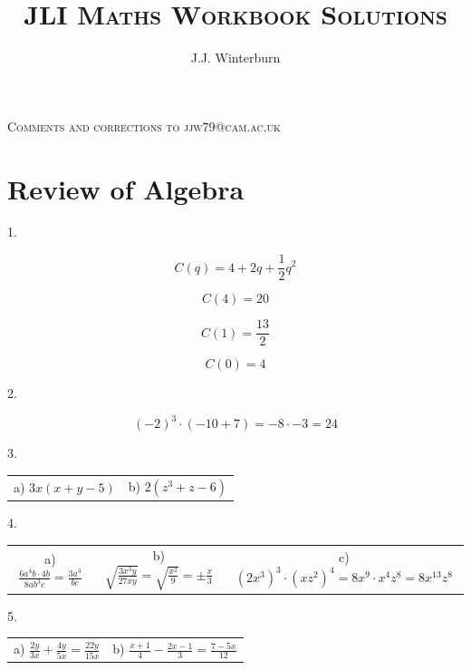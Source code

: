 \documentclass{article}
\begin{document}
\title{\Huge\textsc{JLI Maths Workbook Solutions}}
\author{J.J. Winterburn}
\date{}

\maketitle
\thispagestyle{empty}

\begin{center}
  \textsc{\large{Comments and corrections to jjw79@cam.ac.uk}}
\end{center}

\clearpage


\section{Review of Algebra}
\noindent

1.

$$
  C(q) = 4 + 2q + \frac{1}{2}q^2
$$

$$
  C(4) = 20
$$

$$
  C(1) = \frac{13}{2}
$$

$$
  C(0) = 4
$$

2.

$$
  (-2)^3 \cdot (-10+7) = -8 \cdot -3 = 24
$$

3.

\begin{center}
  \begin{tabular}{ c c }
    a) $3x(x+y-5)$ & b) $2\left( z^3+z-6 \right)$
  \end{tabular}
\end{center}

4.

\begin{center}
  \begin{tabular}{ c c c }
    a) $\frac{6a^4b \cdot 4b}{8ab^3c} = \frac{3a^3}{bc}$ & b) $\sqrt{\frac{3x^3y}{27xy}} = \sqrt{\frac{x^2}{9}} = \pm \frac{x}{3}$ & c) $\left( 2x^3 \right)^3 \cdot \left( xz^2 \right)^4 = 8x^9 \cdot x^4z^8 = 8x^{13}z^8$
  \end{tabular}
\end{center}


5.
\begin{center}
  \begin{tabular}{ c c }
    a) $\frac{2y}{3x} + \frac{4y}{5x} = \frac{22y}{15x}$ & b) $\frac{x+1}{4} - \frac{2x-1}{3} = \frac{7-5x}{12}$
  \end{tabular}
\end{center}
\end{document}
